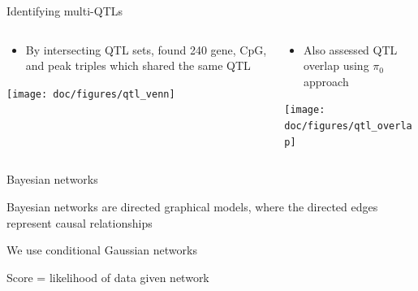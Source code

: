 \documentclass{beamer}
\begin{document}
\begin{frame}{Identifying multi-QTLs}
\begin{columns}
    \begin{column}{0.5\textwidth}
        \begin{itemize}
            \item By intersecting QTL sets, found 240 gene, CpG, and peak
                triples which shared the same QTL 
        \end{itemize}
        \texttt{[image: doc/figures/qtl\_venn]}
    \end{column}
    \pause
    \begin{column}{0.5\textwidth}
        \begin{itemize}
            \item Also assessed QTL overlap using $\pi_0$ approach 
        \end{itemize}
        \vspace{-0.3cm}
        \texttt{[image: doc/figures/qtl\_overlap]}
        \vspace{-0.5cm}
    \end{column}
\end{columns}
\end{frame}

\tikzexternaldisable
\begin{frame}{Bayesian networks}
    \begin{itemize}
        \item Bayesian networks are directed graphical models, where the
            directed edges represent causal relationships
         {
        \item We use conditional Gaussian networks
        }
         {
        \item Score = likelihood of data given network
        }
    \end{itemize}
    \begin{center}
    \end{center}
\end{frame}
\end{document}
